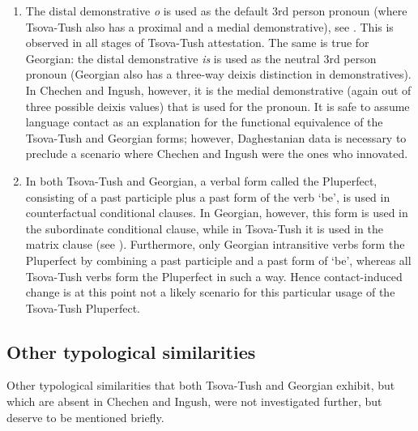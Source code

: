 \begin{enumerate}
	\item The distal demonstrative \textit{o} is used as the default 3rd person pronoun (where Tsova-Tush also has a proximal and a medial demonstrative), see . This is observed in all stages of Tsova-Tush attestation. The same is true for Georgian: the distal demonstrative \textit{is} is used as the neutral 3rd person pronoun (Georgian also has a three-way deixis distinction in demonstratives). In Chechen and Ingush, however, it is the medial demonstrative (again out of three possible deixis values) that is used for the pronoun. It is safe to assume language contact as an explanation for the functional equivalence of the Tsova-Tush and Georgian forms; however, Daghestanian data is necessary to preclude a scenario where Chechen and Ingush were the ones who innovated.
	
	\item In both Tsova-Tush and Georgian, a verbal form called the Pluperfect, consisting of a past participle plus a past form of the verb `be', is used in counterfactual conditional clauses. In Georgian, however, this form is used in the subordinate conditional clause, while in Tsova-Tush it is used in the matrix clause (see ). Furthermore, only Georgian intransitive verbs form the Pluperfect by combining a past participle and a past form of `be', whereas all Tsova-Tush verbs form the Pluperfect in such a way. Hence contact-induced change is at this point not a likely scenario for this particular usage of the Tsova-Tush Pluperfect.
\end{enumerate}


\subsection{Other typological similarities}

Other typological similarities that both Tsova-Tush and Georgian exhibit, but which are absent in Chechen and Ingush, were not investigated further, but deserve to be mentioned briefly.

